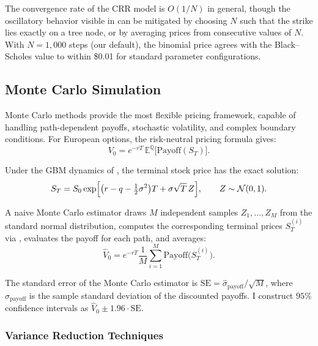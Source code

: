 \documentclass[11pt,a4paper]{article}
\newcommand{\E}{\mathbb{E}}
\begin{document}
The convergence rate of the CRR model is $O(1/N)$ in general, though the oscillatory behavior visible in  can be mitigated by choosing $N$ such that the strike lies exactly on a tree node, or by averaging prices from consecutive values of $N$. With $N = 1{,}000$ steps (our default), the binomial price agrees with the Black--Scholes value to within \$0.01 for standard parameter configurations.


\subsection{Monte Carlo Simulation}\label{subsec:montecarlo}

Monte Carlo methods provide the most flexible pricing framework, capable of handling path-dependent payoffs, stochastic volatility, and complex boundary conditions. For European options, the risk-neutral pricing formula gives:
\begin{equation}\label{eq:mc_pricing}
    V_0 = e^{-rT} \, \E^{\mathbb{Q}} \bigl[ \text{Payoff}(S_T) \bigr].
\end{equation}

Under the GBM dynamics of , the terminal stock price has the exact solution:
\begin{equation}\label{eq:gbm_solution}
    S_T = S_0 \exp\Bigl[ \bigl(r - q - \tfrac{1}{2}\sigma^2\bigr) T + \sigma \sqrt{T} \, Z \Bigr], \qquad Z \sim \mathcal{N}(0, 1).
\end{equation}

A naive Monte Carlo estimator draws $M$ independent samples $Z_1, \ldots, Z_M$ from the standard normal distribution, computes the corresponding terminal prices $S_T^{(i)}$ via , evaluates the payoff for each path, and averages:
\begin{equation}\label{eq:mc_estimator}
    \hat{V}_0 = e^{-rT} \frac{1}{M} \sum_{i=1}^{M} \text{Payoff}\bigl(S_T^{(i)}\bigr).
\end{equation}

The standard error of the Monte Carlo estimator is $\text{SE} = \hat{\sigma}_{\text{payoff}} / \sqrt{M}$, where $\hat{\sigma}_{\text{payoff}}$ is the sample standard deviation of the discounted payoffs. I construct $95\%$ confidence intervals as $\hat{V}_0 \pm 1.96 \cdot \text{SE}$.

\subsubsection{Variance Reduction Techniques}
\end{document}
